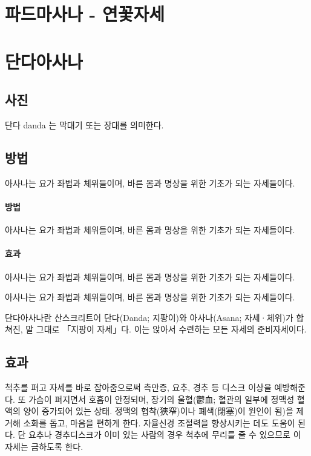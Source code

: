 \documentclass[12pt, a4paper, oneside]{book}
\let\stdsection\section
\renewcommand\section{\newpage\stdsection}
\begin{document}
	\section{파드마사나 - 연꽃자세}



%
	\section{단다아사나}


\subsection{사진}  단다 danda 는 막대기 또는 장대를 의미한다.


\subsection{방법} 아사나는 요가 좌법과 체위들이며, 바른 몸과 명상을 위한 기초가 되는 자세들이다.
	\paragraph{방법} 아사나는 요가 좌법과 체위들이며, 바른 몸과 명상을 위한 기초가 되는 자세들이다.
	\paragraph{효과} 아사나는 요가 좌법과 체위들이며, 바른 몸과 명상을 위한 기초가 되는 자세들이다.


아사나는 요가 좌법과 체위들이며, 바른 몸과 명상을 위한 기초가 되는 자세들이다.



단다아사나란 산스크리트어 단다(Danda; 지팡이)와 아사나(Asana; 자세·체위)가 합쳐진, 말 그대로 「지팡이 자세」다. 이는 앉아서 수련하는 모든 자세의 준비자세이다. 

\subsection{효과}

척추를 펴고 자세를 바로 잡아줌으로써 측만증, 요추, 경추 등  디스크 이상을 예방해준다. 
또 가슴이 펴지면서 호흡이 안정되며, 장기의 울혈(鬱血; 혈관의 일부에 정맥성 혈액의 양이 증가되어 있는 상태. 정맥의 협착(狹窄)이나 폐색(閉塞)이 원인이 됨)을 제거해 소화를 돕고, 마음을 편하게 한다. 
자율신경 조절력을 향상시키는 데도 도움이 된다.
단 요추나 경추디스크가 이미 있는 사람의 경우 척추에 무리를 줄 수 있으므로 이 자세는 금하도록 한다.
\end{document}
